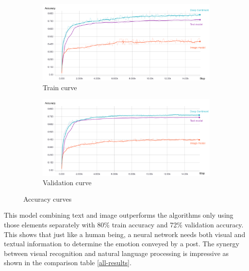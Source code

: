 \documentclass{article} %
\begin{document}
\begin{figure}[H]
    \begin{subfigure}[t]{.5\textwidth}
        \vskip 0pt %
        \centering
        \includegraphics[width=\linewidth]{Images/train.jpg}
        \caption{Train curve}
   \end{subfigure}
   \begin{subfigure}[t]{.5\textwidth}
       \vskip 0pt
       \centering
       \includegraphics[width=\linewidth]{Images/validation.jpg}
       \caption{Validation curve}
    \end{subfigure}
    \caption{Accuracy curves}
    \label{train-validation}
\end{figure}

This model combining text and image outperforms the algorithms only using those elements separately with 80\% train accuracy and 72\% validation accuracy. This shows that just like a human being, a neural network needs both visual and textual information to determine the emotion conveyed by a post. The synergy between visual recognition and natural language processing is impressive as shown in the comparison table \ref{all-results}.
\end{document}
